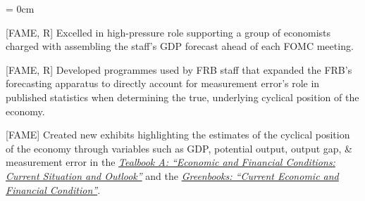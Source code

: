 \documentclass[a4paper, 11pt]{article}
\begin{document}
    \begin{compactitem}\parskip = 0cm
      \item {[FAME, R]} Excelled in high-pressure role supporting a group of economists charged with assembling the staff's GDP forecast ahead of each FOMC meeting.
      \item {[FAME, R]} Developed programmes used by FRB staff that expanded the FRB's forecasting apparatus to directly account for measurement error's role in published statistics when determining the true, underlying cyclical position of the economy.
      \item {[FAME]} Created new exhibits highlighting the estimates of the cyclical position of the economy through variables such as GDP, potential output, output gap, \& measurement error in the \href{https://www.federalreserve.gov/monetarypolicy/fomc_historical.htm#tealbooks}{\textit{Tealbook A: ``Economic and Financial Conditions: Current Situation and Outlook''}} and the \href{https://www.federalreserve.gov/monetarypolicy/fomc_historical.htm#greenbooks}{\textit{Greenbooks: ``Current Economic and Financial Condition''}}.
    \end{compactitem}
\end{document}

